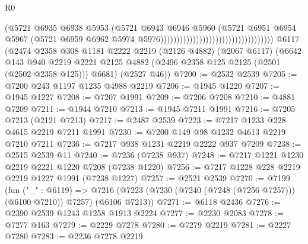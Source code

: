 \begin{lexlean}{R0}
\begin{coremodule}
                                                                  (@5721
                                                                    @6935
                                                                    @6938
                                                                    @5953
                                                                    (@5721
                                                                      @6943
                                                                      @6946
                                                                      @5960
                                                                      (@5721
                                                                        @6951
                                                                        @6954
                                                                        @5967
                                                                        (@5721
                                                                          @6959
                                                                          @6962
                                                                          @5974
                                                                          @5976)))))))))))))))))))))))))))))))))))
    @6117
    (@2474
      @2358
      @308
      @1181
      @2222
      @2219
      (@2126 @4882)
      (@2067 @6117)
      (@6642
        @143
        @940
        @2219
        @2221
        @2125
        @4882
        (@2496 @2358 @125 @2125 (@2501 (@2502 @2358 @125)))
        @6681)
      (@2527 @46))
@7200 := @2532 @2539
@7205 := @7200 @243 @1197 @1235 @4988 @2219
@7206 := @1945 @1220
@7207 := @1945 @1227
@7208 := @7207 @1991
@7209 := @7206 @7208
@7210 := @4881 @7209
@7211 := @1944 @7210
@7213 := @1945 @7211 @1991
@7216 := @7205 @7213 (@2121 @7213)
@7217 := @2487 @2539
@7223 := @7217 @1233 @228 @4615 @2219 @7211 @1991
@7230 := @7200 @149 @98 @1232 @4613 @2219 @7210 @7211
@7236 := @7217 @938 @1231 @2219 @2222 @937 @7209
@7238 := @2515 @2539 @11
@7240 := @7236 (@7238 @937)
@7248 := @7217 @1221 @1230 @2219 @2221 @1220 @7208 (@7238 @1220)
@7256 := @7217 @1228 @228 @2219 @2219 @1227 @1991 (@7238 @1227)
@7257 := @2521 @2539
@7270 := @7199
    (fun ("_" : @6119) =>
    @7216 (@7223 (@7230 (@7240 (@7248 (@7256 @7257))) (@6100 @7210)) @7257) (@6106 @7213))
@7271 := @6118 @2436
@7276 := @2390 @2539 @1243 @1258 @1913 @2224
@7277 := @2230 @2083
@7278 := @7277 @163
@7279 := @2229 @7278
@7280 := @7279 @2219
@7281 := @2227 @7280
@7283 := @2236 @7278 @2219

\end{coremodule}
\end{lexlean}
